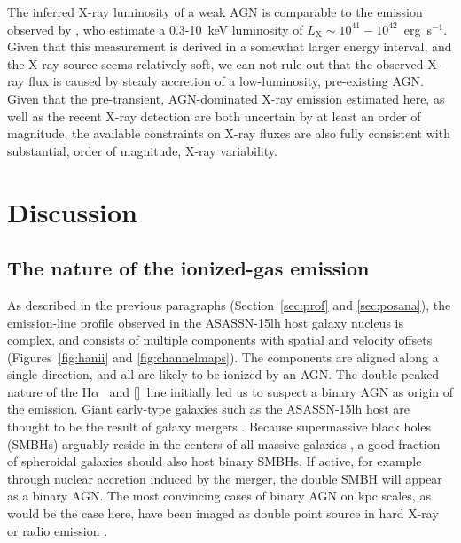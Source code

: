 \documentclass[traditabstract]{aa}
\newcommand{\ha}{H$\alpha$}
\newcommand{\nii}{[\ion{N}{ii}]}
\begin{document}
The inferred X-ray luminosity of a weak AGN is comparable to the emission observed by \citet{2017ApJ...836...25M}, who estimate a 0.3-10~keV luminosity of $L_{\mathrm{X}}\sim10^{41} - 10^{42} $~erg~s$^{-1}$. Given that this measurement is derived in a somewhat larger energy interval, and the X-ray source seems relatively soft, we can not rule out that the observed X-ray flux is caused by steady accretion of a low-luminosity, pre-existing AGN. Given that the pre-transient, AGN-dominated X-ray emission estimated here, as well as the recent X-ray detection \citep{2017ApJ...836...25M} are both uncertain by at least an order of magnitude, the available constraints on X-ray fluxes are also fully consistent with substantial, order of magnitude, X-ray variability.



\section{Discussion}
\label{sec:Disc}

\subsection{The nature of the ionized-gas emission}
\label{sec:nation}

As described in the previous paragraphs (Section~\ref{sec:prof} and \ref{sec:posana}), the emission-line profile observed in the ASASSN-15lh host galaxy nucleus is complex, and consists of multiple components with spatial and velocity offsets (Figures~\ref{fig:hanii} and \ref{fig:channelmaps}). The components are aligned along a single direction, and all are likely to be ionized by an AGN. The double-peaked nature of the \ha~ and \nii~line initially led us to suspect a binary AGN as origin of the emission. Giant early-type galaxies such as the ASASSN-15lh host are thought to be the result of galaxy mergers \citep[e.g.,][and references therein]{2006ApJS..163....1H}. Because supermassive black holes (SMBHs) arguably reside in the centers of all massive galaxies \citep[e.g.,][for a review]{2013ARA&A..51..511K}, a good fraction of spheroidal galaxies should also host binary SMBHs. If active, for example through nuclear accretion induced by the merger, the double SMBH will appear as a binary AGN. The most convincing cases of binary AGN on kpc scales, as would be the case here, have been imaged as double point source in hard X-ray \citep[e.g.,][]{2003ApJ...582L..15K, 2008MNRAS.386..105B} or radio emission \citep{2011ApJ...740L..44F, 2015ApJ...813..103M}.
\end{document}
